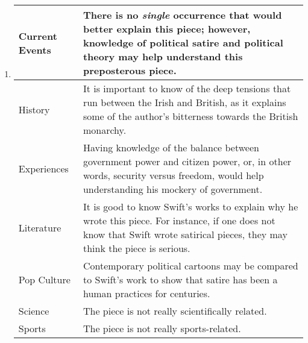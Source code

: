 \documentclass[12pt]{article}
\begin{document}
\begin{enumerate}
      \item

        \begin{center}
          \begin{tabular}[h]{| p{} | p{} |}
            \hline
            Current Events & There is no \textit{single} occurrence that would better explain this piece; however, knowledge of political satire and political theory may help understand this preposterous piece.  \\
            \hline
            History & It is important to know of the deep tensions that run between the Irish and British, as it explains some of the author's bitterness towards the British monarchy.  \\
            \hline
            Experiences & Having knowledge of the balance between government power and citizen power, or, in other words, security versus freedom, would help understanding his mockery of government.  \\
            \hline
            Literature & It is good to know Swift's works to explain why he wrote this piece. For instance, if one does not know that Swift wrote satirical pieces, they may think the piece is serious.  \\
            \hline
            Pop Culture & Contemporary political cartoons may be compared to Swift's work to show that satire has been a human practices for centuries.  \\
            \hline
            Science & The piece is not really scientifically related.  \\
            \hline
            Sports & The piece is not really sports-related.  \\
            \hline
          \end{tabular}
        \end{center}

    \end{enumerate}
\end{document}
